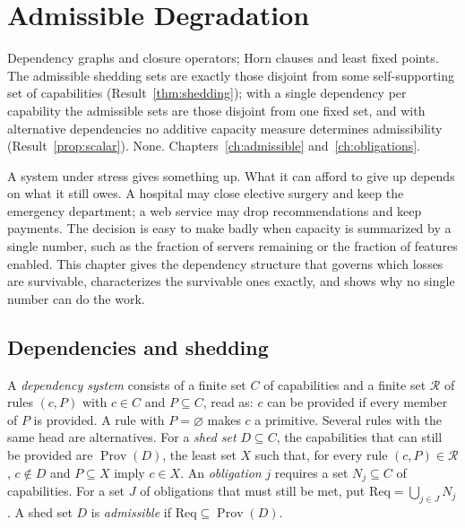 \chapter{Admissible Degradation}\label{ch:degradation}
{Dependency graphs and closure operators; Horn clauses and least fixed points.}
{The admissible shedding sets are exactly those disjoint from some self-supporting set of capabilities (Result~\ref{thm:shedding}); with a single dependency per capability the admissible sets are those disjoint from one fixed set, and with alternative dependencies no additive capacity measure determines admissibility (Result~\ref{prop:scalar}).}
{None.}
{Chapters~\ref{ch:admissible} and~\ref{ch:obligations}.}

A system under stress gives something up. What it can afford to give up depends on what it still owes. A hospital may close elective surgery and keep the emergency department; a web service may drop recommendations and keep payments. The decision is easy to make badly when capacity is summarized by a single number, such as the fraction of servers remaining or the fraction of features enabled. This chapter gives the dependency structure that governs which losses are survivable, characterizes the survivable ones exactly, and shows why no single number can do the work.

\section{Dependencies and shedding}

\begin{definition}\label{def:dependency}
A \emph{dependency system} consists of a finite set $C$ of capabilities and a finite set $\mathcal R$ of rules $(c,P)$ with $c\in C$ and $P\subseteq C$, read as: $c$ can be provided if every member of $P$ is provided. A rule with $P=\varnothing$ makes $c$ a primitive. Several rules with the same head are alternatives. For a \emph{shed set} $D\subseteq C$, the capabilities that can still be provided are $\operatorname{Prov}(D)$, the least set $X$ such that, for every rule $(c,P)\in\mathcal R$, $c\notin D$ and $P\subseteq X$ imply $c\in X$. An \emph{obligation} $j$ requires a set $N_j\subseteq C$ of capabilities. For a set $J$ of obligations that must still be met, put $\mathrm{Req}=\bigcup_{j\in J}N_j$. A shed set $D$ is \emph{admissible} if $\mathrm{Req}\subseteq\operatorname{Prov}(D)$.
\end{definition}


